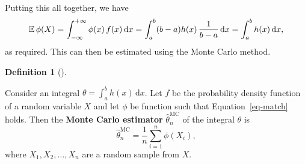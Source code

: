 \documentclass[
  letterpaper,
  DIV=11,
  numbers=noendperiod]{scrreprt}
\theoremstyle{plain}
\theoremstyle{definition}
\newtheorem{definition}{Definition}[chapter]
\theoremstyle{definition}
\theoremstyle{remark}
\begin{document}
Putting this all together, we have
\[ \operatorname{\mathbb{E}} \phi(X) = \int_{-\infty}^{+\infty} \phi(x)\,f(x)\,\mathrm{d}x = \int_a^b (b-a)h(x)\,\frac{1}{b-a}\,\mathrm{d}x = \int_a^b h(x) \,\mathrm{d}x ,\]
as required. This can then be estimated using the Monte Carlo method.

\begin{definition}[]\protect\hypertarget{def-MCint}{}\label{def-MCint}

Consider an integral \(\theta = \int_a^b h(x)\,\mathrm{d}x\). Let \(f\)
be the probability density function of a random variable \(X\) and let
\(\phi\) be function such that Equation~\ref{eq-match} holds. Then the
\textbf{Monte Carlo estimator} \(\widehat\theta_n^{\mathrm{MC}}\) of the
integral \(\theta\) is
\[ \widehat{\theta}_n^{\mathrm{MC}} = \frac{1}{n} \sum_{i=1}^n \phi(X_i) , \]
where \(X_1, X_2, \dots, X_n\) are a random sample from \(X\).

\end{definition}
\end{document}
